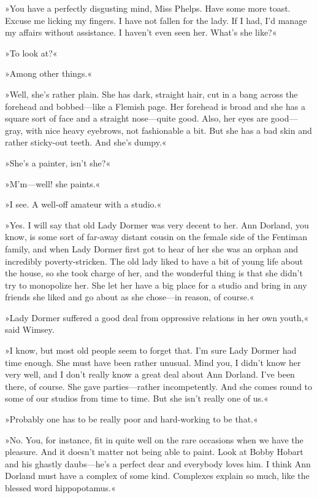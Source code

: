 »You have a perfectly disgusting mind, Miss Phelps. Have some more toast. Excuse me licking my fingers. I have not fallen for the lady. If I had, I'd manage my affairs without assistance. I haven't even seen her. What's she like?«

»To look at?«

»Among other things.«

»Well, she's rather plain. She has dark, straight hair, cut in a bang across the forehead and bobbed—like a Flemish page. Her forehead is broad and she has a square sort of face and a straight nose—quite good. Also, her eyes are good—gray, with nice heavy eyebrows, not fashionable a bit. But she has a bad skin and rather sticky-out teeth. And she's dumpy.«

»She's a painter, isn't she?«

»M'm—well! she paints.«

»I see. A well-off amateur with a studio.«

»Yes. I will say that old Lady Dormer was very decent to her. Ann Dorland, you know, is some sort of far-away distant cousin on the female side of the Fentiman family, and when Lady Dormer first got to hear of her she was an orphan and incredibly poverty-stricken. The old lady liked to have a bit of young life about the house, so she took charge of her, and the wonderful thing is that she didn't try to monopolize her. She let her have a big place for a studio and bring in any friends she liked and go about as she chose—in reason, of course.«

»Lady Dormer suffered a good deal from oppressive relations in her own youth,« said Wimsey.

»I know, but most old people seem to forget that. I'm sure Lady Dormer had time enough. She must have been rather unusual. Mind you, I didn't know her very well, and I don't really know a great deal about Ann Dorland. I've been there, of course. She gave parties—rather incompetently. And she comes round to some of our studios from time to time. But she isn't really one of us.«

»Probably one has to be really poor and hard-working to be that.«

»No. You, for instance, fit in quite well on the rare occasions when we have the pleasure. And it doesn't matter not being able to paint. Look at Bobby Hobart and his ghastly daubs—he's a perfect dear and everybody loves him. I think Ann Dorland must have a complex of some kind. Complexes explain so much, like the blessed word hippopotamus.«

